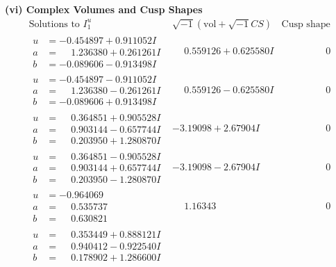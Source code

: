 \documentclass[1p]{elsarticle_modified}
\theoremstyle{definition}
\newcommand{\I}{\sqrt{-1}}
\begin{document}
\newpage\flushleft \textbf{(vi) Complex Volumes and Cusp Shapes}
$$\begin{array}{c|c|c}  
\text{Solutions to }I^u_{1}& \I (\text{vol} + \sqrt{-1}CS) & \text{Cusp shape}\\
 \hline 
\begin{aligned}
u &= -0.454897 + 0.911052 I \\
a &= \phantom{-}1.236380 + 0.261261 I \\
b &= -0.089606 - 0.913498 I\end{aligned}
 & \phantom{-}0.559126 + 0.625580 I & \phantom{-0.000000 } 0 \\ \hline\begin{aligned}
u &= -0.454897 - 0.911052 I \\
a &= \phantom{-}1.236380 - 0.261261 I \\
b &= -0.089606 + 0.913498 I\end{aligned}
 & \phantom{-}0.559126 - 0.625580 I & \phantom{-0.000000 } 0 \\ \hline\begin{aligned}
u &= \phantom{-}0.364851 + 0.905528 I \\
a &= \phantom{-}0.903144 - 0.657744 I \\
b &= \phantom{-}0.203950 + 1.280870 I\end{aligned}
 & -3.19098 + 2.67904 I & \phantom{-0.000000 } 0 \\ \hline\begin{aligned}
u &= \phantom{-}0.364851 - 0.905528 I \\
a &= \phantom{-}0.903144 + 0.657744 I \\
b &= \phantom{-}0.203950 - 1.280870 I\end{aligned}
 & -3.19098 - 2.67904 I & \phantom{-0.000000 } 0 \\ \hline\begin{aligned}
u &= -0.964069\phantom{ +0.000000I} \\
a &= \phantom{-}0.535737\phantom{ +0.000000I} \\
b &= \phantom{-}0.630821\phantom{ +0.000000I}\end{aligned}
 & \phantom{-}1.16343\phantom{ +0.000000I} & \phantom{-0.000000 } 0 \\ \hline\begin{aligned}
u &= \phantom{-}0.353449 + 0.888121 I \\
a &= \phantom{-}0.940412 - 0.922540 I \\
b &= \phantom{-}0.178902 + 1.286600 I\end{aligned}

\end{array}$$
\end{document}
